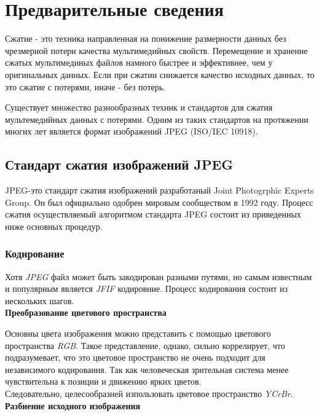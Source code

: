 \documentclass{matmex-diploma-custom}
\begin{document}
\section{Предварительные сведения}
Сжатие - это техника направленная на понижение размерности данных без чрезмерной потери качества мультимедийных свойств.
Перемещение и хранение сжатых мультимединых  файлов намного быстрее  и эффективнее, чем у оригинальных данных. Если при сжатии снижается качество исходных данных, то это сжатие с потерями, иначе - без потерь.

Существует множество разнообразных  техник и стандартов для сжатия мультемедийных данных с потерями.
 Одним из таких стандартов на протяжении многих лет является формат изображений JPEG (ISO/IEC 10918).

\subsection{Стандарт сжатия изображений JPEG}
JPEG-это стандарт сжатия изображений разработаный Joint Photogrphic Experts Group. Он был официально одобрен мировым сообществом в 1992 году.%
 Процесс сжатия осуществляемый алгоритмом стандарта JPEG состоит из приведенных ниже основных процедур.

\subsubsection{Кодирование}
Хотя \emph{JPEG} файл может быть закодирован разными путями, но самым известным и популярным является \emph{JFIF} кодировние.
Процесс кодирования состоит из нескольких шагов.\\

\textbf{Преобразование цветового пространства} \newline

Основны цвета изображения можно  представить с помощью цветового пространства \emph{RGB}. Такое представление, однако,
сильно коррелирует, что подразумевает, что это цветовое пространство не очень подходит для независимого кодирования. Так как человеческая зрительная система менее чувствительна к позиции и движению ярких  цветов. \\
Следовательно, целесообразней изпользовать цветовое пространство \emph{YCrBr}.\\

\textbf{Разбиение исходного изображения}\newline
\end{document}
